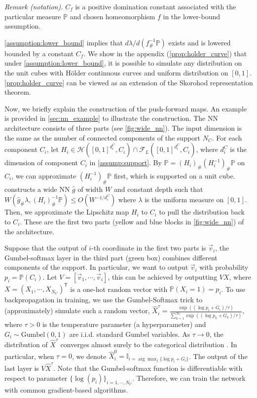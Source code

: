 \noindent\textit{Remark (notation).} $C_f$ is a positive domination constant associated with the particular measure $\mathbb{P}$ and chosen homeomorphism $f$ in the lower-bound assumption.

\cref{assumption:lower_bound} implies that $d \lambda /d (f^{-1}_{\#}\mathbb{P})$ exists and is lowered bounded by a constant $C_f$. We show in the appendix (\cref{prop:holder_curve}) that under \cref{assumption:lower_bound}, it is possible to simulate any distribution on the unit cubes with Hölder continuous curves and uniform distribution on $ [ 0,1]$. \cref{prop:holder_curve} can be viewed as an extension of the Skorohod representation theorem. 

Now, we briefly explain the construction of the push-forward maps. An example is provided in \cref{sec:nn_example} to illustrate the construction. The NN architecture consists of three parts (see \cref{fig:wide_nn}). The input dimension is the same as the number of connected components of the support $ N_C $. For each component $ C_i $, let $ H_i\in \mathcal{H}([0,1]^{d^C_i},C_i) \cap \mathcal{F}_L([0,1]^{d^C_i},C_i) $, where $d_i^C$ is the dimension of component $C_i$ in \cref{assump:support}. By $ \mathbb{P} = (H_i)_{\#}(H_i^{-1})_{\#} \mathbb{P} $ on $ C_i $, we can approximate $ (H_i^{-1})_{\#} \mathbb{P} $ first, which is supported on a unit cube. \cite{perekrestenkoHighDimensionalDistributionGeneration2022a} constructs a wide NN $ \hat{g}$ of width $ W $ and constant depth such that $ W(\hat{g}_{\#} \lambda,(H_i)^{-1}_{\#}\mathbb{P})\leqslant O(W^{-1/d_i^C}) $ where $ \lambda $ is the uniform measure on $ [0,1] $. Then, we approximate the Lipschitz map $ H_i $ to $C_i$ to pull the distribution back to $ C_i $. These are the first two parts (yellow and blue blocks in \cref{fig:wide_nn}) of the architecture. \par 

Suppose that the output of $i$-th coordinate in the first two parts is $ \Vec{v}_i $, the Gumbel-softmax layer in the third part (green box) combines different components of the support. In particular, we want to output $ \Vec{v}_i $ with probability $ p_i = \mathbb{P}(C_i) $. Let $ V = [\Vec{v}_1,\cdots,\Vec{v}_i] $, this can be achieved by outputting  $ V X $, where $ X = (X_1,\cdots,X_{N_C})^\mathsf{T}  $ is a one-hot random vector with $ \mathbb{P}({X}_i = 1) =  p_i$. To use backpropagation in training, we use the Gumbel-Softmax trick \cite{Jang2016CategoricalRW} to (approximately) simulate such a random vector, 
 $\hat{X}^\tau_i = \frac{\exp((\log p_i +G_i)/\tau)}{\sum_{k=1}^{N_C}\exp((\log p_k +G_k)/\tau)}, $
where $ \tau>0 $ is the temperature parameter (a hyperparameter) and $ G_i\sim \text{Gumbel}(0,1) $ are i.i.d. standard Gumbel variables. As $\tau \rightarrow 0$, the distribution of $\hat{X}^\tau$ converges almost surely to the categorical distribution \cite[Proposition 1]{maddisonConcreteDistributionContinuous2017}. In particular, when $ \tau = 0$, we denote $\hat{X}_i^0 = \mathbb{I}_{i = \arg\max_j \{\log p_i + G_i\}}$. The output of the last layer is $V\hat{X}^\tau$. Note that the Gumbel-softmax function is differentiable with respect to parameter $ \{\log (p_i)\}_{i=1,\cdots,N_C}$. Therefore, we can train the network with common gradient-based algorithms. 

